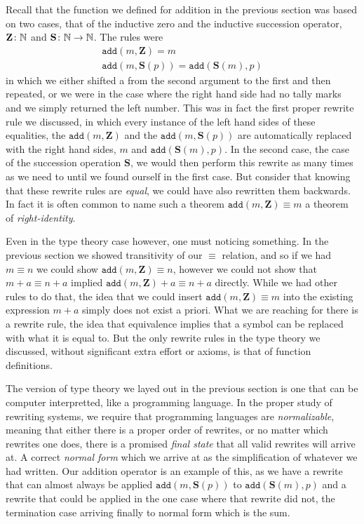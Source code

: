 \documentclass[11pt]{article}
\begin{document}
Recall that the function we defined for addition in the previous section was based on two cases, that of the inductive zero and the inductive succession operator, $\mathbf{Z}\colon \mathbb{N}$ and $\mathbf{S}\colon \mathbb{N} \to \mathbb{N}$. The rules were \begin{gather*}
\mathtt{add}(m, \mathbf{Z}) = m \\
\mathtt{add}(m, \mathbf{S}(p)) = \mathtt{add}(\mathbf{S}(m),p)
\end{gather*}
in which we either shifted a  from the second argument to the first and then repeated, or we were in the case where the right hand side had no tally marks and we simply returned the left number. This was in fact the first proper rewrite rule we discussed, in which every instance of the left hand sides of these equalities, the $\mathtt{add}(m, \mathbf{Z})$ and the $\mathtt{add}(m, \mathbf{S}(p))$ are automatically replaced with the right hand sides, $m$ and $\mathtt{add}(\mathbf{S}(m),p)$. In the second case, the case of the succession operation $\mathbf{S}$, we would then perform this rewrite as many times as we need to until we found ourself in the first case. But consider that knowing that these rewrite rules are \emph{equal}, we could have also rewritten them backwards. In fact it is often common to name such a theorem $\mathtt{add}(m, \mathbf{Z}) \equiv m$ a theorem of \emph{right-identity}. 

Even in the type theory case however, one must noticing something. In the previous section we showed transitivity of our $\equiv$ relation, and so if we had $m \equiv n$ we could show $\mathtt{add}(m, \mathbf{Z}) \equiv n$, however we could not show that $m + a \equiv n + a$ implied $\mathtt{add}(m, \mathbf{Z}) + a\equiv n + a$ directly. While we had other rules to do that, the idea that we could insert $\mathtt{add}(m, \mathbf{Z}) \equiv m$ into the existing expression $m + a$ simply does not exist a priori. What we are reaching for there is a rewrite rule, the idea that equivalence implies that a symbol can be replaced with what it is equal to. But the only rewrite rules in the type theory we discussed, without significant extra effort or axioms, is that of function definitions.

The version of type theory we layed out in the previous section is one that can be computer interpretted, like a programming language. In the proper study of rewriting systems, we require that programming languages are \emph{normalizable}, meaning that either there is a proper order of rewrites, or no matter which rewrites one does, there is a promised \emph{final state} that all valid rewrites will arrive at. A correct \emph{normal form} which we arrive at as the simplification of whatever we had written. Our addition operator is an example of this, as we have a rewrite that can almost always be applied $\mathtt{add}(m,\mathbf{S}(p))$ to $\mathtt{add}(\mathbf{S}(m),p)$ and a rewrite that could be applied in the one case where that rewrite did not, the termination case arriving finally to normal form which is the sum.
\end{document}
